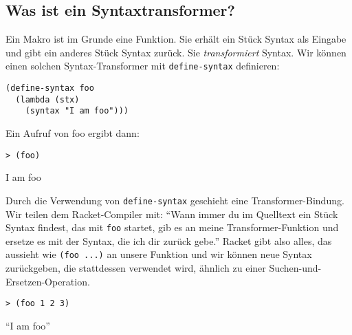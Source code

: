 \subsection{Was ist ein Syntaxtransformer?}

Ein Makro ist im Grunde eine Funktion. Sie erhält ein Stück Syntax als Eingabe und gibt ein anderes Stück Syntax zurück. Sie \textit{transformiert} Syntax. Wir können einen solchen Syntax-Transformer mit \texttt{define-syntax} definieren:

\begin{lstlisting}
(define-syntax foo
  (lambda (stx)
    (syntax "I am foo")))
\end{lstlisting}

Ein Aufruf von foo ergibt dann:

\begin{lstlisting}
> (foo)
\end{lstlisting}
{\routput {\qq}I am foo{\qq}}

Durch die Verwendung von \texttt{define-syntax} geschieht eine Transformer-Bindung. Wir teilen dem Racket-Compiler mit: ``Wann immer du im Quelltext ein Stück Syntax findest, das mit \texttt{foo} startet, gib es an meine Transformer-Funktion und ersetze es mit der Syntax, die ich dir zurück gebe.'' Racket gibt also alles, das aussieht wie \texttt{(foo ...)} an unsere Funktion und wir können neue Syntax zurückgeben, die stattdessen verwendet wird, ähnlich zu einer Suchen-und-Ersetzen-Operation.

\begin{lstlisting}
> (foo 1 2 3)
\end{lstlisting}
{\routput ``I am foo''}


%   
% 

%   


